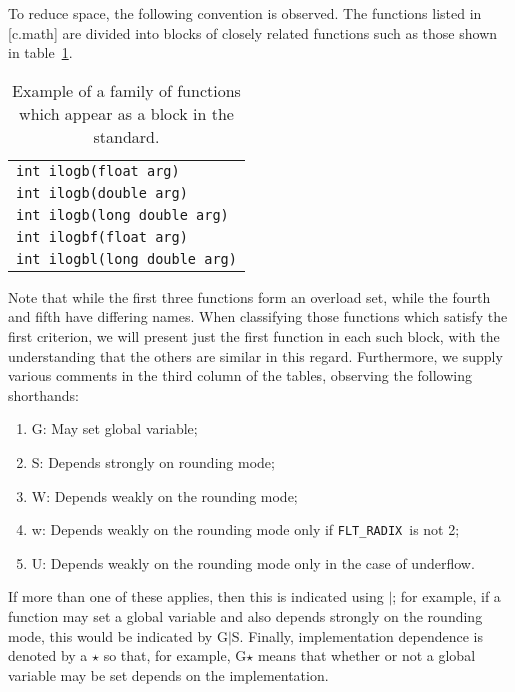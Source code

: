 \documentclass[prd,twocolumn,amsmath,amssymb,nofootinbib,eqsecnum]{revtex4-1}
\newcommand{\code}[1]{{\tt #1}}
\newcommand{\FLTRADIX}{{\tt FLT\_RADIX}}
\begin{document}
To reduce space, the following convention is observed. The
functions listed in [c.math] are divided into blocks of closely related
functions such as those shown in table~\ref{tab:example}. 
\begin{table}[h]
	\begin{tabular}{l}
		\code{int ilogb(float arg)}
	\\
		\code{int ilogb(double arg)}
	\\
		\code{int ilogb(long double arg)}
	\\
		\code{int ilogbf(float arg)}
	\\
		\code{int ilogbl(long double arg)}
	\end{tabular}
\caption{Example of a family of functions which appear as a block in the standard.}
\label{tab:example}
\end{table}
Note that while the first three functions form an overload set, while the fourth and fifth
have differing names.  When classifying those functions which satisfy the first
criterion, we will present just the first function in each such block, with the
understanding that the others are similar in this regard. Furthermore, 
we supply various comments in the
third column of the tables, observing the following shorthands:
\begin{enumerate}
	\item G: May set global variable;
	
	\item S: Depends strongly on rounding mode;
	
	\item W: Depends weakly on the rounding mode;
	
	\item w: Depends weakly on the rounding mode only if \FLTRADIX\ is not 2;
	
	\item U: Depends weakly on the rounding mode only in the case of underflow.
\end{enumerate}
If more than one of these applies, then this is indicated using $\vert$; for example, if a function may set a global variable and also depends strongly on the rounding mode, this would be indicated by G$\vert$S. Finally, implementation dependence is denoted by a $\star$ so that, for example, G$\star$ means that whether or not a global variable may be set depends on the implementation.
\end{document}
